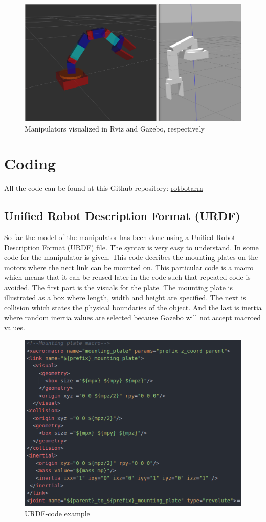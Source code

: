 \begin{figure}[htbp]
  \centering
  \includegraphics[width=.9\textwidth]{img/test.png}
  \caption{Manipulators visualized in Rviz and Gazebo, respectively}
  \label{fig:robot}
\end{figure}


\section*{Coding}
All the code can be found at this Github repository: \href{https://github.com/Aarskog/robotarm}{\underline{rotbotarm}}


\subsection*{Unified Robot Description Format (URDF)}
So far the model of the manipulator has been done using a Unified Robot Description Format (URDF) file. The syntax is very easy to understand. In  some code for the manipulator is given. This code decribes the mounting plates on the motors where the nect link can be mounted on. 
This particular code is a macro which means that it can be reused later in the code such that repeated code is avoided. The first part is the visuals for the plate. The mounting plate is illustrated as a box where length, width and height are specified. The next is collision which states the physical boundaries of the object. And the last is inertia where random inertia values are selected because Gazebo will not accept macroed values.


\begin{figure}[htbp]
  \centering
  \includegraphics[width=.7\textwidth]{img/urdf_code_example.png}
  \caption{URDF-code example}
  \label{fig:urdf_code_example}
\end{figure}




